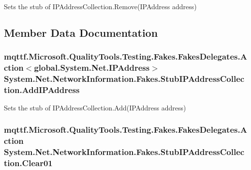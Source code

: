 Sets the stub of I\-P\-Address\-Collection.\-Remove(\-I\-P\-Address address)



\subsection{Member Data Documentation}
\hypertarget{class_system_1_1_net_1_1_network_information_1_1_fakes_1_1_stub_i_p_address_collection_abeb073cdd1b042feb09ba313d33436d4}{
\subsubsection[{Add\-I\-P\-Address}]{\setlength{\rightskip}{0pt plus 5cm}mqttf.\-Microsoft.\-Quality\-Tools.\-Testing.\-Fakes.\-Fakes\-Delegates.\-Action$<$global.\-System.\-Net.\-I\-P\-Address$>$ System.\-Net.\-Network\-Information.\-Fakes.\-Stub\-I\-P\-Address\-Collection.\-Add\-I\-P\-Address}}\label{class_system_1_1_net_1_1_network_information_1_1_fakes_1_1_stub_i_p_address_collection_abeb073cdd1b042feb09ba313d33436d4}


Sets the stub of I\-P\-Address\-Collection.\-Add(\-I\-P\-Address address)

\hypertarget{class_system_1_1_net_1_1_network_information_1_1_fakes_1_1_stub_i_p_address_collection_a65b05322e04c197c2618b4dceea58716}{
\subsubsection[{Clear01}]{\setlength{\rightskip}{0pt plus 5cm}mqttf.\-Microsoft.\-Quality\-Tools.\-Testing.\-Fakes.\-Fakes\-Delegates.\-Action System.\-Net.\-Network\-Information.\-Fakes.\-Stub\-I\-P\-Address\-Collection.\-Clear01}}\label{class_system_1_1_net_1_1_network_information_1_1_fakes_1_1_stub_i_p_address_collection_a65b05322e04c197c2618b4dceea58716}


